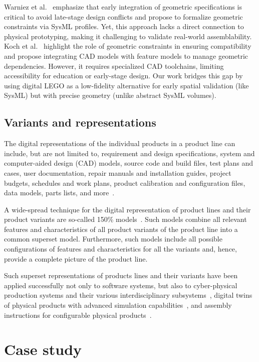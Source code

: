 \documentclass[sigconf,review]{acmart}
\begin{document}
Warniez et al.~\cite{Warniez_2014} emphasize that early integration of geometric specifications is critical to avoid late-stage design conflicts and propose to formalize geometric constraints via SysML profiles. 
Yet, this approach lacks a direct connection to physical prototyping, making it challenging to validate real-world assemblability.
Koch et al.~\cite{Koch_2016} highlight the role of geometric constraints in ensuring compatibility and propose integrating CAD models with feature models to manage geometric dependencies. 
However, it requires specialized CAD toolchains, limiting accessibility for education or early-stage design. 
Our work bridges this gap by using digital LEGO as a low-fidelity alternative for early spatial validation (like SysML) but with precise geometry (unlike abstract SysML volumes).


\subsection{Variants and representations}
\label{sec:variants}

The digital representations of the individual products in a product line can include, but are not limited to, requirement and design specifications, system and computer-aided design (CAD) models, source code and build files, test plans and cases, user documentation, repair manuals and installation guides, project budgets, schedules and work plans, product calibration and configuration files, data models, parts lists, and more~\cite{Clements_2015}. 

A wide-spread technique for the digital representation of product lines and their product variants are so-called 150\% models~\cite{Clements_2015}.
Such models combine all relevant features and characteristics of all product variants of the product line into a common superset model.
Furthermore, such models include all possible configurations of features and characteristics for all the variants and, hence, provide a complete picture of the product line.

Such superset representations of products lines and their variants have been applied successfully not only to software systems, but also to cyber-physical production systems and their various interdisciplinary subsystems~\cite{Fadhlillah_2023}, digital twins of physical products with advanced simulation capabilities~\cite{Wagner_2024}, and assembly instructions for configurable physical products~\cite{Zogopoulos_2024}.

\section{Case study}
\label{sec:case-study}
\end{document}
